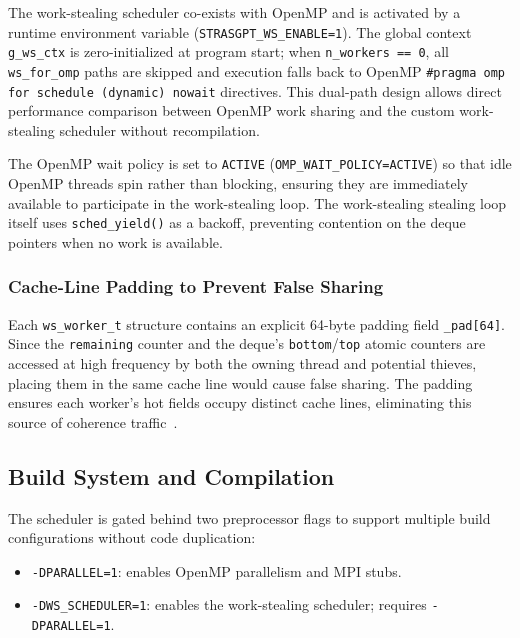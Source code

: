 \documentclass[11pt,english]{article}
\begin{document}
The work-stealing scheduler co-exists with OpenMP and is activated by a runtime environment variable (\texttt{STRASGPT\_WS\_ENABLE=1}). The global context \texttt{g\_ws\_ctx} is zero-initialized at program start; when \texttt{n\_workers == 0}, all \texttt{ws\_for\_omp} paths are skipped and execution falls back to OpenMP \texttt{\#pragma omp for schedule (dynamic) nowait} directives. This dual-path design allows direct performance comparison between OpenMP work sharing and the custom work-stealing scheduler without recompilation.
 
The OpenMP wait policy is set to \texttt{ACTIVE} (\texttt{OMP\_WAIT\_POLICY=ACTIVE}) so that idle OpenMP threads spin rather than blocking, ensuring they are immediately available to participate in the work-stealing loop. The work-stealing stealing loop itself uses \texttt{sched\_yield()} as a backoff, preventing contention on the deque pointers when no work is available.
 
\subsubsection{Cache-Line Padding to Prevent False Sharing}
 
Each \texttt{ws\_worker\_t} structure contains an explicit 64-byte padding field \texttt{\_pad[64]}. Since the \texttt{remaining} counter and the deque's \texttt{bottom}/\texttt{top} atomic counters are accessed at high frequency by both the owning thread and potential thieves, placing them in the same cache line would cause false sharing. The padding ensures each worker's hot fields occupy distinct cache lines, eliminating this source of coherence traffic~\cite{yanghe2018survey}.
 
\subsection{Build System and Compilation}
 
The scheduler is gated behind two preprocessor flags to support multiple build configurations without code duplication:
 
\begin{itemize}
    \item \texttt{-DPARALLEL=1}: enables OpenMP parallelism and MPI stubs.
    \item \texttt{-DWS\_SCHEDULER=1}: enables the work-stealing scheduler; requires \texttt{-DPARALLEL=1}.
\end{itemize}
 
\end{document}
